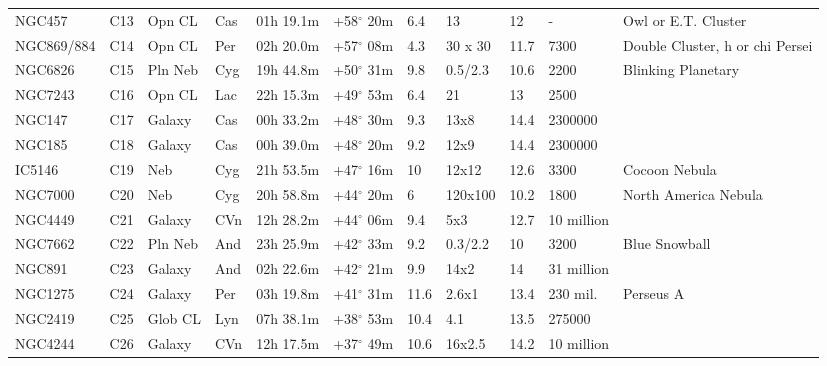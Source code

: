 \begin{longtable}{@{}lllllllllll@{}}
NGC457     & C13           & Opn CL  & Cas & 01h 19.1m & +58$^{\circ}$ 20m & 6.4  & 13             & 12   & -             & Owl or E.T. Cluster             \\
NGC869/884 & C14           & Opn CL  & Per & 02h 20.0m & +57$^{\circ}$ 08m & 4.3  & 30 x 30        & 11.7 & 7300          & Double Cluster, h or chi Persei \\
NGC6826    & C15           & Pln Neb & Cyg & 19h 44.8m & +50$^{\circ}$ 31m & 9.8  & 0.5/2.3        & 10.6 & 2200          & Blinking Planetary              \\
NGC7243    & C16           & Opn CL  & Lac & 22h 15.3m & +49$^{\circ}$ 53m & 6.4  & 21             & 13   & 2500          &                                 \\
NGC147     & C17           & Galaxy  & Cas & 00h 33.2m & +48$^{\circ}$ 30m & 9.3  & 13x8           & 14.4 & 2300000       &                                 \\
NGC185     & C18           & Galaxy  & Cas & 00h 39.0m & +48$^{\circ}$ 20m & 9.2  & 12x9           & 14.4 & 2300000       &                                 \\
IC5146     & C19           & Neb     & Cyg & 21h 53.5m & +47$^{\circ}$ 16m & 10   & 12x12          & 12.6 & 3300          & Cocoon Nebula                   \\
NGC7000    & C20           & Neb     & Cyg & 20h 58.8m & +44$^{\circ}$ 20m & 6    & 120x100        & 10.2 & 1800          & North America Nebula            \\
NGC4449    & C21           & Galaxy  & CVn & 12h 28.2m & +44$^{\circ}$ 06m & 9.4  & 5x3            & 12.7 & 10 million    &                                 \\
NGC7662    & C22           & Pln Neb & And & 23h 25.9m & +42$^{\circ}$ 33m & 9.2  & 0.3/2.2        & 10   & 3200          & Blue Snowball                   \\
NGC891     & C23           & Galaxy  & And & 02h 22.6m & +42$^{\circ}$ 21m & 9.9  & 14x2           & 14   & 31 million    &                                 \\
NGC1275    & C24           & Galaxy  & Per & 03h 19.8m & +41$^{\circ}$ 31m & 11.6 & 2.6x1          & 13.4 & 230 mil.      & Perseus A                       \\
NGC2419    & C25           & Glob CL & Lyn & 07h 38.1m & +38$^{\circ}$ 53m & 10.4 & 4.1            & 13.5 & 275000        &                                 \\
NGC4244    & C26           & Galaxy  & CVn & 12h 17.5m & +37$^{\circ}$ 49m & 10.6 & 16x2.5         & 14.2 & 10 million    &                                 \\

\end{longtable}
